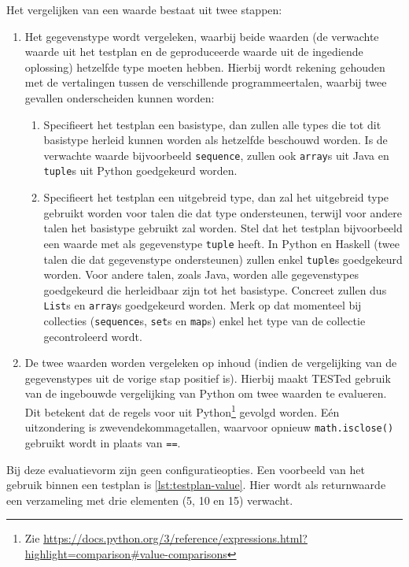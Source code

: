 Het vergelijken van een waarde bestaat uit twee stappen:
\begin{enumerate}
    \item Het gegevenstype wordt vergeleken, waarbij beide waarden (de verwachte waarde uit het testplan en de geproduceerde waarde uit de ingediende oplossing) hetzelfde type moeten hebben.
    Hierbij wordt rekening gehouden met de vertalingen tussen de verschillende programmeertalen, waarbij twee gevallen onderscheiden kunnen worden:
    \begin{enumerate}
        \item Specifieert het testplan een basistype, dan zullen alle types die tot dit basistype herleid kunnen worden als hetzelfde beschouwd worden.
        Is de verwachte waarde bijvoorbeeld \texttt{sequence}, zullen ook \texttt{array}s uit Java en \texttt{tuple}s uit Python goedgekeurd worden.
        \item Specifieert het testplan een uitgebreid type, dan zal het uitgebreid type gebruikt worden voor talen die dat type ondersteunen, terwijl voor andere talen het basistype gebruikt zal worden.
        Stel dat het testplan bijvoorbeeld een waarde met als gegevenstype \texttt{tuple} heeft.
        In Python en Haskell (twee talen die dat gegevenstype ondersteunen) zullen enkel \texttt{tuple}s goedgekeurd worden.
        Voor andere talen, zoals Java, worden alle gegevenstypes goedgekeurd die herleidbaar zijn tot het basistype.
        Concreet zullen dus \texttt{List}s en \texttt{array}s goedgekeurd worden.
        Merk op dat momenteel bij collecties (\texttt{sequence}s, \texttt{set}s en \texttt{map}s) enkel het type van de collectie gecontroleerd wordt.
    \end{enumerate}
    \item De twee waarden worden vergeleken op inhoud (indien de vergelijking van de gegevenstypes uit de vorige stap positief is).
    Hierbij maakt TESTed gebruik van de ingebouwde vergelijking van Python om twee waarden te evalueren.
    Dit betekent dat de regels voor  uit Python\footnote{Zie \url{https://docs.python.org/3/reference/expressions.html?highlight=comparison\#value-comparisons}} gevolgd worden.
    Eén uitzondering is zwevendekommagetallen, waarvoor opnieuw \texttt{math.isclose()} gebruikt wordt in plaats van \texttt{==}.
\end{enumerate}

Bij deze evaluatievorm zijn geen configuratieopties.
Een voorbeeld van het gebruik binnen een testplan is \cref{lst:testplan-value}.
Hier wordt als returnwaarde een verzameling met drie elementen (5, 10 en 15) verwacht.

